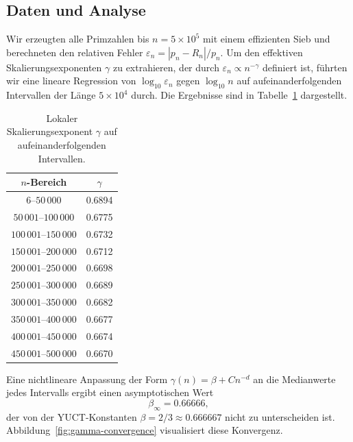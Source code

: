 \documentclass[11pt,a4paper]{article}
\begin{document}
	\subsection{Daten und Analyse}
	Wir erzeugten alle Primzahlen bis \(n = 5\times10^5\) mit einem effizienten Sieb und berechneten den relativen Fehler \(\varepsilon_n = |p_n - R_n|/p_n\). Um den effektiven Skalierungsexponenten \(\gamma\) zu extrahieren, der durch \(\varepsilon_n \propto n^{-\gamma}\) definiert ist, führten wir eine lineare Regression von \(\log_{10}\varepsilon_n\) gegen \(\log_{10}n\) auf aufeinanderfolgenden Intervallen der Länge \(5\times10^4\) durch. Die Ergebnisse sind in Tabelle~\ref{tab:gamma} dargestellt.
	
	\begin{table}[htbp]
		\centering
		\caption{Lokaler Skalierungsexponent \(\gamma\) auf aufeinanderfolgenden Intervallen.}
		\label{tab:gamma}
		\small
		\begin{tabular}{c c}
			\toprule
			\(n\)-Bereich & \(\gamma\) \\
			\midrule
			\(6\)--\(50\,000\)    & 0.6894 \\
			\(50\,001\)--\(100\,000\) & 0.6775 \\
			\(100\,001\)--\(150\,000\)& 0.6732 \\
			\(150\,001\)--\(200\,000\)& 0.6712 \\
			\(200\,001\)--\(250\,000\)& 0.6698 \\
			\(250\,001\)--\(300\,000\)& 0.6689 \\
			\(300\,001\)--\(350\,000\)& 0.6682 \\
			\(350\,001\)--\(400\,000\)& 0.6677 \\
			\(400\,001\)--\(450\,000\)& 0.6674 \\
			\(450\,001\)--\(500\,000\)& 0.6670 \\
			\bottomrule
		\end{tabular}
	\end{table}
	
	Eine nichtlineare Anpassung der Form \(\gamma(n) = \beta + C n^{-d}\) an die Medianwerte jedes Intervalls ergibt einen asymptotischen Wert
	\[
	\beta_{\infty} = 0.66666,
	\]
	der von der YUCT-Konstanten \(\beta = 2/3 \approx 0.666667\) nicht zu unterscheiden ist. Abbildung~\ref{fig:gamma-convergence} visualisiert diese Konvergenz.
	
\end{document}
